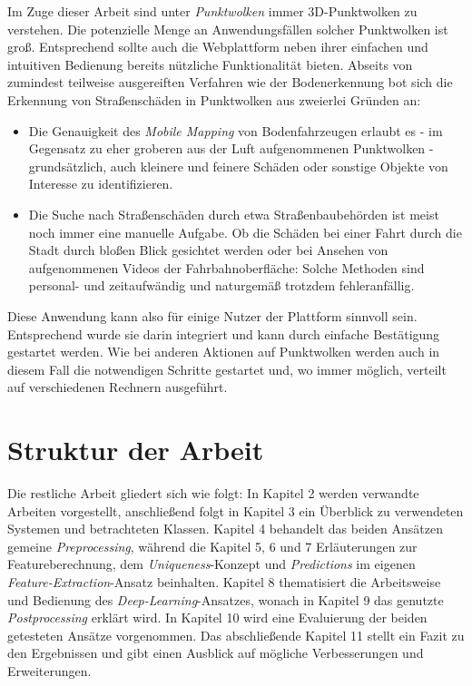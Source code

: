 Im Zuge dieser Arbeit sind unter \textit{Punktwolken} immer 3D-Punktwolken zu verstehen. Die potenzielle Menge an Anwendungsfällen solcher Punktwolken ist groß. Entsprechend sollte auch die Webplattform neben ihrer einfachen und intuitiven Bedienung bereits nützliche Funktionalität bieten. Abseits von zumindest teilweise ausgereiften Verfahren wie der Bodenerkennung bot sich die Erkennung von Straßenschäden in Punktwolken aus zweierlei Gründen an:
\begin{itemize}
    \item Die Genauigkeit des \textit{Mobile Mapping} von Bodenfahrzeugen erlaubt es - im Gegensatz zu eher groberen aus der Luft aufgenommenen Punktwolken - grundsätzlich, auch kleinere und feinere Schäden oder sonstige Objekte von Interesse zu identifizieren.
    \item Die Suche nach Straßenschäden durch etwa Straßenbaubehörden ist meist noch immer eine manuelle Aufgabe. Ob die Schäden bei einer Fahrt durch die Stadt durch bloßen Blick gesichtet werden oder bei Ansehen von aufgenommenen Videos der Fahrbahnoberfläche: Solche Methoden sind personal- und zeitaufwändig und naturgemäß trotzdem fehleranfällig.
\end{itemize}
Diese Anwendung kann also für einige Nutzer der Plattform sinnvoll sein. Entsprechend wurde sie darin integriert und kann durch einfache Bestätigung gestartet werden. Wie bei anderen Aktionen auf Punktwolken werden auch in diesem Fall die notwendigen Schritte gestartet und, wo immer möglich, verteilt auf verschiedenen Rechnern ausgeführt.

\section{Struktur der Arbeit}

Die restliche Arbeit gliedert sich wie folgt: In Kapitel 2 werden verwandte Arbeiten vorgestellt, anschließend folgt in Kapitel 3 ein Überblick zu verwendeten Systemen und betrachteten Klassen. Kapitel 4 behandelt das beiden Ansätzen gemeine \textit{Preprocessing}, während die Kapitel 5, 6 und 7 Erläuterungen zur Featureberechnung, dem \textit{Uniqueness}-Konzept und \textit{Predictions} im eigenen \textit{Feature-Extraction}-Ansatz beinhalten. Kapitel 8 thematisiert die Arbeitsweise und Bedienung des \textit{Deep-Learning}-Ansatzes, wonach in Kapitel 9 das genutzte \textit{Postprocessing} erklärt wird. In Kapitel 10 wird eine Evaluierung der beiden getesteten Ansätze vorgenommen. Das abschließende Kapitel 11 stellt ein Fazit zu den Ergebnissen und gibt einen Ausblick auf mögliche Verbesserungen und Erweiterungen.
